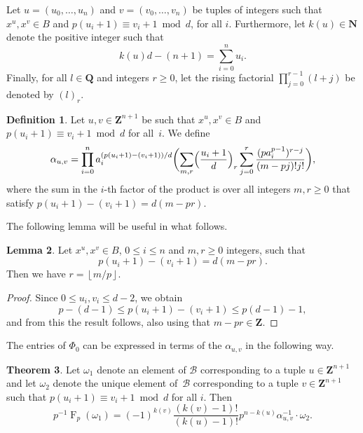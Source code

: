 \documentclass[a4paper,11pt]{article}
\numberwithin{equation}{section}
\providecommand{\floor}[1]{\left\lfloor#1\right\rfloor}   %
\newcommand{\NN}{\mathbf{N}} %
\newcommand{\ZZ}{\mathbf{Z}} %
\newcommand{\QQ}{\mathbf{Q}} %
\DeclareMathOperator{\Frob}{F}           %
\providecommand{\cB}{\mathcal{B}} %
\theoremstyle{definition}
\newtheorem{thm}{Theorem}[section]
\newtheorem{lem}[thm]{Lemma}
\newtheorem{defn}[thm]{Definition}
\begin{document}
Let $u = (u_0, \dotsc, u_n)$ and $v = (v_0, \dotsc, v_n)$ be tuples 
of integers such that $x^u, x^v \in B$ and $p (u_i+1) \equiv v_i+1 \bmod{d}$,
for all $i$. Furthermore, let $k(u) \in \NN$ denote the positive integer such that 
\[
k(u) d -(n+1) = \sum_{i=0}^n u_i.
\] 
Finally, for all $l \in \QQ$ and integers $r \geq 0$, let the rising factorial $\prod_{j=0}^{r-1} (l + j)$ be
denoted by $(l)_r$.

\begin{defn} \label{defn:alpha}
Let $u, v \in \ZZ^{n+1}$ be such that 
$x^u, x^v \in B$ and 
$p (u_i + 1) \equiv v_i + 1 \bmod{d}$ for all~$i$. 
We define
\begin{equation*}
\alpha_{u,v} = \prod_{i=0}^n a_i^{(p (u_i + 1) - (v_i + 1))/d} 
    \biggl( \sum_{m,r} \Bigl( \frac{u_i+1}{d} \Bigr)_r 
        \sum_{j=0}^{r} \frac{(p a_i^{p-1})^{r-j}}{(m-pj)!j!} \biggr),
\end{equation*}
where the sum in the $i$-th factor of the product is over all integers $m, r \geq 0$  
that satisfy $p(u_i+1)-(v_i+1)=d(m-pr)$.
\end{defn}

The following lemma will be useful in what follows.

\begin{lem} \label{lem:mpr}
Let $x^u, x^v \in B$, $0 \leq i \leq n$ and $m, r \geq 0$ integers, such that 
\[
p(u_i + 1) - (v_i + 1) = d(m-pr).
\] 
Then we have $r = \floor{m/p}$.
\end{lem}

\begin{proof}
Since $0 \leq u_i, v_i \leq d-2$, we obtain
\[
p-(d-1) \leq p(u_i + 1) - (v_i + 1) \leq p(d-1)-1,
\]
and from this the result follows, also using that $m - pr \in \ZZ$.
\end{proof}

The entries of $\Phi_0$ can be expressed in terms of the $\alpha_{u,v}$ in the following way.

\begin{thm} \label{thm:01-03-diagfrob}
Let $\omega_1$ denote an element of $\cB$ corresponding to a tuple 
$u \in \ZZ^{n+1}$ and let $\omega_2$ denote the unique element of~$\cB$ 
corresponding to a tuple $v \in \ZZ^{n+1}$ such that
$p (u_i + 1) \equiv v_i + 1 \bmod{d}$ for all $i$. Then
\begin{equation} \label{eq:diagfrobformula}
p^{-1} \Frob_p (\omega_1) = 
    (-1)^{k(v)} \frac{(k(v) - 1)!}{(k(u) - 1)!} p^{n-k(u)} \alpha_{u,v}^{-1} \cdot \omega_2.
\end{equation}
\end{thm}
\end{document}

